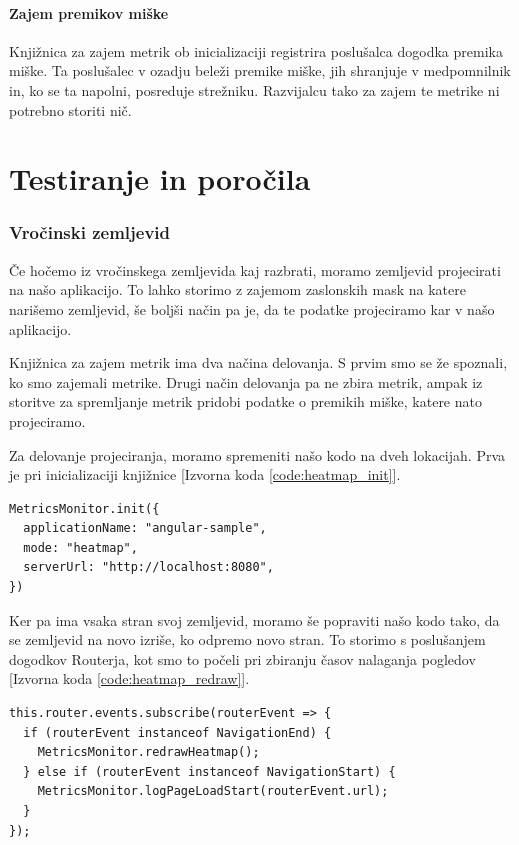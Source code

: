 \documentclass[a4paper, 12pt]{book}
\begin{document}
\paragraph{Zajem premikov miške}

Knjižnica za zajem metrik ob inicializaciji registrira poslušalca dogodka premika miške. Ta poslušalec v ozadju beleži premike miške, jih shranjuje v medpomnilnik in, ko se ta napolni, posreduje strežniku. Razvijalcu tako za zajem te metrike ni potrebno storiti nič.

\section{Testiranje in poročila}
\label{ch3:sec4}

\subsubsection{Vročinski zemljevid}

Če hočemo iz vročinskega zemljevida kaj razbrati, moramo zemljevid projecirati na našo aplikacijo. To lahko storimo z zajemom zaslonskih mask na katere narišemo zemljevid, še boljši način pa je, da te podatke projeciramo kar v našo aplikacijo.

Knjižnica za zajem metrik ima dva načina delovanja. S prvim smo se že spoznali, ko smo zajemali metrike. Drugi način delovanja pa ne zbira metrik, ampak iz storitve za spremljanje metrik pridobi podatke o premikih miške, katere nato projeciramo.

Za delovanje projeciranja, moramo spremeniti našo kodo na dveh lokacijah. Prva je pri inicializaciji knjižnice [Izvorna koda \ref{code:heatmap_init}]. 

\begin{lstlisting}[label=code:heatmap_init, caption=Sprememba načina delovanja knjižnice]
MetricsMonitor.init({
  applicationName: "angular-sample",
  mode: "heatmap",
  serverUrl: "http://localhost:8080",
})
\end{lstlisting}

Ker pa ima vsaka stran svoj zemljevid, moramo še popraviti našo kodo tako, da se zemljevid na novo izriše, ko odpremo novo stran. To storimo s poslušanjem dogodkov Routerja, kot smo to počeli pri zbiranju časov nalaganja pogledov [Izvorna koda \ref{code:heatmap_redraw}].

\begin{lstlisting}[label=code:heatmap_redraw, caption=Sprememba zemljevida ob prehodu na novo stran]
this.router.events.subscribe(routerEvent => {
  if (routerEvent instanceof NavigationEnd) {
    MetricsMonitor.redrawHeatmap();
  } else if (routerEvent instanceof NavigationStart) {
    MetricsMonitor.logPageLoadStart(routerEvent.url);
  }	
});
\end{lstlisting}
\end{document}
